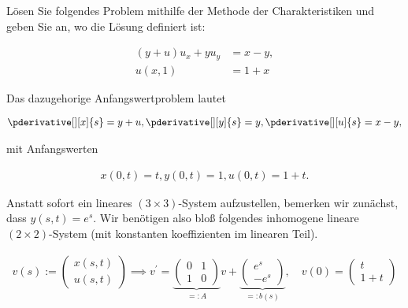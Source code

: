 
\begin{exercise}

Lösen Sie folgendes Problem mithilfe der Methode der Charakteristiken und geben Sie an, wo die Lösung definiert ist:

\begin{align*}
    (y + u) u_x + y u_y
    & =
    x - y, \\
    u(x, 1)
    & =
    1 + x
\end{align*}

\end{exercise}


\begin{solution}

Das dazugehorige Anfangswertproblem lautet

\begin{align*}
    \pderivative[][x]{s} = y + u,
    \pderivative[][y]{s} = y,
    \pderivative[][u]{s} = x - y,
\end{align*}

mit Anfangswerten

\begin{align*}
    x(0, t) = t,
    y(0, t) = 1,
    u(0, t) = 1 + t.
\end{align*}

Anstatt sofort ein lineares $(3 \times 3)$-System aufzustellen, bemerken wir zunächst, dass $y(s, t) = e^s$.
Wir benötigen also bloß folgendes inhomogene lineare $(2 \times 2)$-System (mit konstanten koeffizienten im linearen Teil).

\begin{align*}
    v(s)
    :=
    \begin{pmatrix}
        x(s, t) \\ u(s, t)
    \end{pmatrix}
    \implies
    v^\prime
    =
    \underbrace
    {
        \begin{pmatrix}
            0 & 1 \\
            1 & 0
        \end{pmatrix}
    }_{=: A} v
    +
    \underbrace
    {
        \begin{pmatrix}
            e^s \\ -e^s
        \end{pmatrix}
    }_{=: b(s)},
    \quad
    v(0)
    =
    \begin{pmatrix}
        t \\ 1 + t
    \end{pmatrix}
\end{align*}


\end{solution}
